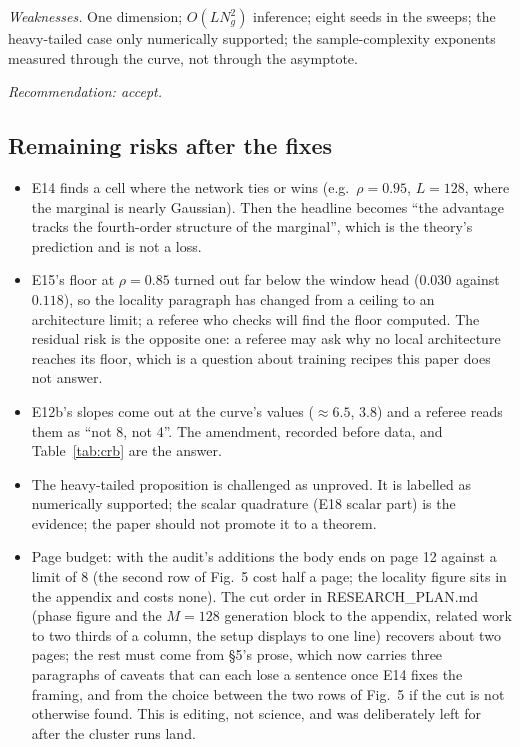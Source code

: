 \emph{Weaknesses.} One dimension; $O(LN_g^2)$ inference; eight seeds in the sweeps; the heavy-tailed case only numerically supported; the sample-complexity exponents measured through the curve, not through the asymptote.

\emph{Recommendation: accept.}

\subsection{Remaining risks after the fixes}

\begin{itemize}
\item E14 finds a cell where the network ties or wins (e.g.\ $\rho=0.95$, $L=128$, where the marginal is nearly Gaussian). Then the headline becomes ``the advantage tracks the fourth-order structure of the marginal'', which is the theory's prediction and is not a loss.
\item E15's floor at $\rho=0.85$ turned out far below the window head ($0.030$ against $0.118$), so the locality paragraph has changed from a ceiling to an architecture limit; a referee who checks will find the floor computed. The residual risk is the opposite one: a referee may ask why no local architecture reaches its floor, which is a question about training recipes this paper does not answer.
\item E12b's slopes come out at the curve's values ($\approx6.5$, $3.8$) and a referee reads them as ``not 8, not 4''. The amendment, recorded before data, and Table~\ref{tab:crb} are the answer.
\item The heavy-tailed proposition is challenged as unproved. It is labelled as numerically supported; the scalar quadrature (E18 scalar part) is the evidence; the paper should not promote it to a theorem.
\item Page budget: with the audit's additions the body ends on page 12 against a limit of 8 (the second row of Fig.~5 cost half a page; the locality figure sits in the appendix and costs none). The cut order in RESEARCH\_PLAN.md (phase figure and the $M=128$ generation block to the appendix, related work to two thirds of a column, the setup displays to one line) recovers about two pages; the rest must come from \S5's prose, which now carries three paragraphs of caveats that can each lose a sentence once E14 fixes the framing, and from the choice between the two rows of Fig.~5 if the cut is not otherwise found. This is editing, not science, and was deliberately left for after the cluster runs land.
\end{itemize}
